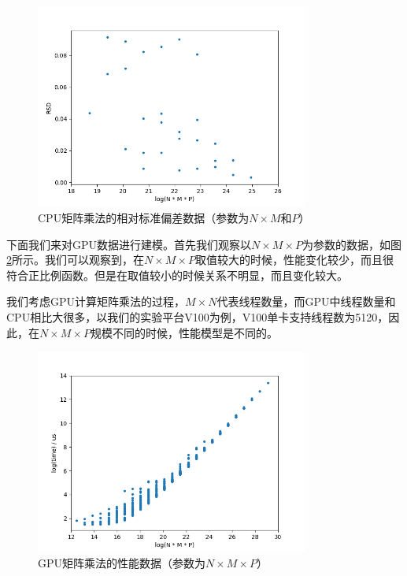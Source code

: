     \begin{figure}[!htbp]
        \centering
        \includegraphics[width=0.8\textwidth]{figures/matmul_cpu_nm_p_rsd.png}
        \caption{CPU矩阵乘法的相对标准偏差数据（参数为$ N \times M $和$ P $）}
        \label{fig:matmul_cpu_nm_p_rsd}
    \end{figure}

    下面我们来对GPU数据进行建模。首先我们观察以$ N \times M \times P $为参数的数据，如图\ref{fig:matmul_gpu_nmp}所示。我们可以观察到，在$ N \times M \times P $取值较大的时候，性能变化较少，而且很符合正比例函数。但是在取值较小的时候关系不明显，而且变化较大。
    
    我们考虑GPU计算矩阵乘法的过程，$ M \times N $代表线程数量，而GPU中线程数量和CPU相比大很多，以我们的实验平台V100为例，V100单卡支持线程数为5120，因此，在$ N \times M \times P $规模不同的时候，性能模型是不同的。
    
    \begin{figure}[!htbp]
        \centering
        \includegraphics[width=0.8\textwidth]{figures/matmul_gpu_nmp.png}
        \caption{GPU矩阵乘法的性能数据（参数为$N \times M \times P $）}
        \label{fig:matmul_gpu_nmp}
    \end{figure}

